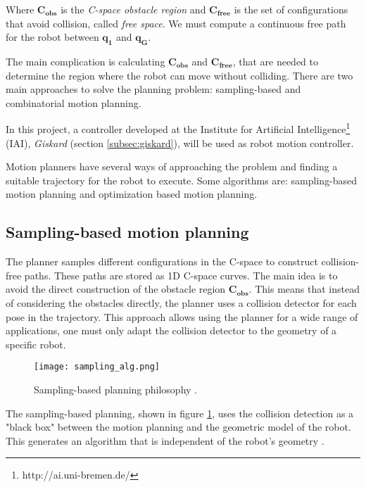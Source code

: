Where $\bm{C_{obs}}$ is the \textit{C-space obstacle region} and $\bm{C_{free}}$ is the set of configurations that avoid collision, called \textit{free space}. We must compute a continuous free path for the robot between $\bm{q_{1}}$ and $\bm{q_{G}}$.

The main complication is calculating $\bm{C_{obs}}$ and $\bm{C_{free}}$, that are needed to determine the region where the robot can move without colliding. There are two main approaches to solve the planning problem: sampling-based and combinatorial motion planning.

In this project, a controller developed at the Institute for Artificial Intelligence\footnote{http://ai.uni-bremen.de/} (IAI), \textit{Giskard} (section \ref{subsec:giskard}), will be used as robot motion controller.

Motion planners have several ways of approaching the problem and finding a suitable trajectory for the robot to execute. Some algorithms are: sampling-based motion planning and optimization based motion planning.

\subsection{Sampling-based motion planning}
\label{subsec:planning}

The planner samples different configurations in the C-space to construct collision-free paths. These paths are stored as 1D C-space curves. The main idea is to avoid the direct construction of the obstacle region $\bm{C_{obs}}$. This means that instead of considering the obstacles directly, the planner uses a collision detector for each pose in the trajectory. This approach allows using the planner for a wide range of applications, one must only adapt the collision detector to the geometry of a specific robot.
\begin{figure}[H]
	\centering
	\texttt{[image: sampling\_alg.png]}
	\vspace{-10pt}
	\caption[Sampling-based planning]{Sampling-based planning philosophy \citep[chap. 5, page 185]{planning}.}
	\vspace{-15pt}
	\label{fig:sampling}
\end{figure}

The sampling-based planning, shown in figure \ref{fig:sampling}, uses the collision detection as a "black box" between the motion planning and the geometric model of the robot. This generates an algorithm that is independent of the robot's geometry \citep{planning} .

